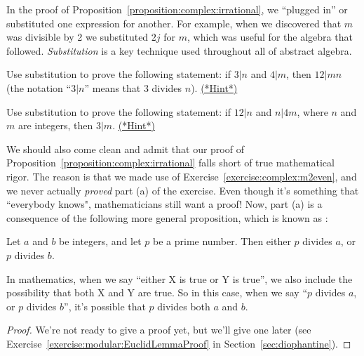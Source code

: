 In the proof of Proposition~\ref{proposition:complex:irrational},  we ``plugged in'' or substituted one expression for another.   For example, when we discovered that $m$ was divisible by 2 we substituted $2j$ for $m$, which was useful for the algebra that followed.
\emph{Substitution} is a key technique used throughout all of abstract algebra.

\begin{exercise}\label{exercise:complex:2}
Use substitution to prove the following statement:  if $3 | n$ and $4 | m$, then $12 | mn$ (the notation ``$3 | n$'' means that 3 divides $n$). 
\hyperref[sec:complex:hints]{(*Hint*)}
\end{exercise}

\begin{exercise}\label{exercise:complex:3}
Use substitution to prove the following statement:  if $12 | n$ and $n | 4m$, where $n$ and $m$ are integers, then $3 | m$.
\hyperref[sec:complex:hints]{(*Hint*)}
\end{exercise}

We should also come clean and admit that our proof of Proposition~\ref{proposition:complex:irrational} falls short of true mathematical rigor. The reason is that we made use of Exercise~\ref{exercise:complex:m2even}, and we never actually \emph{proved} part (a) of the exercise. Even though it's something that ``everybody knows", mathematicians still want a proof! Now, part (a) is a consequence of the following more general proposition, which is known as :

\begin{prop}\label{proposition:complex:EuclidLemma}
Let $a$ and $b$ be integers, and let $p$ be a prime number. Then either $p$ divides $a$, or $p$ divides $b$.

\begin{rem}
In mathematics, when we say ``either X is true or Y is true'', we also include the possibility that both X and Y are true. So in this case, when we say ``$p$ divides $a$, or $p$ divides $b$'', it's possible that $p$ divides both $a$ and $b$.
\end{rem}

\end{prop}
\begin{proof}
We're not ready to give a proof yet, but we'll give one later (see Exercise~\ref{exercise:modular:EuclidLemmaProof}  in Section~\ref{sec:diophantine}).
\end{proof}


